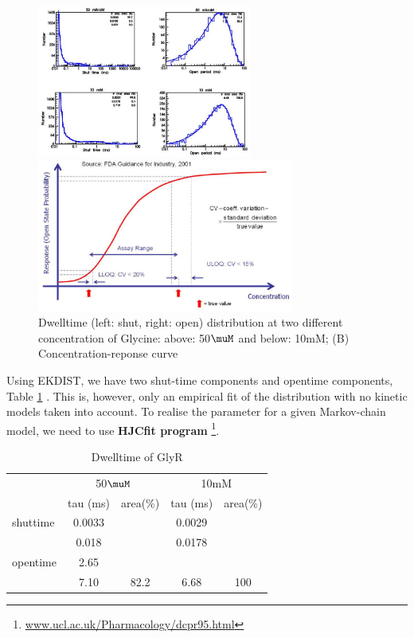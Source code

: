 \begin{figure}[hbt]
  \centerline{\includegraphics[height=5cm,
    angle=0]{./images/GlyR_dwelltime.eps}}
  \centerline{\includegraphics[height=5cm,
    angle=0]{./images/concentration-response_curve.eps}}
  \caption{Dwelltime (left: shut, right: open) distribution at two different
  concentration of Glycine: above: 50$\muM$ and below: 10mM; (B)
  Concentration-reponse curve}
\label{fig:GlyR_dwelltime}
\end{figure}

Using EKDIST, we have two shut-time components and opentime components, Table
\ref{tab:dwelltime_GlyR} \citep{lodesani2008}. This is, however, only an
empirical fit of the distribution with no kinetic models taken into account. To
realise the parameter for a given Markov-chain model, we need to use {\bf HJCfit
program} \footnote{\url{www.ucl.ac.uk/Pharmacology/dcpr95.html}}.

\begin{table}[hbt]
\begin{center}
    \begin{tabular}{lcccc}
        \hline
     & \multicolumn{2}{c}{50$\muM$} & \multicolumn{2}{c}{10mM} \\
     & tau (ms) & area(\%) & tau (ms) & area(\%) \\
shuttime & 0.0033 & & 0.0029 &  \\
    & 0.018 & & 0.0178 & \\
opentime & 2.65 & & & \\
	& 7.10 & 82.2 & 6.68 & 100 \\
    \end{tabular}
\end{center}
\caption{Dwelltime of GlyR}
\label{tab:dwelltime_GlyR}
\end{table}


